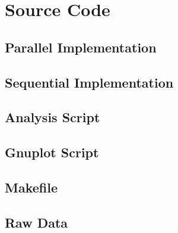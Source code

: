 \documentclass[11pt]{article}
\begin{document}
\section{Source Code}
\lstset{numbers=left, language=C}
\subsection{Parallel Implementation}

\pagebreak
\subsection{Sequential Implementation}

\subsection{Analysis Script}

\subsection{Gnuplot Script}

\subsection{Makefile}

\subsection{Raw Data}


\end{document}
